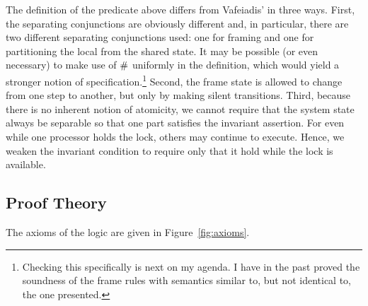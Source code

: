 \documentclass[11pt]{article}
\begin{document}
The definition of the predicate above differs from Vafeiadis' in three ways. First, the separating conjunctions are obviously different and, in particular, there are two different separating conjunctions used: one for framing and one for partitioning the local from the shared state. It may be possible (or even necessary) to make use of $\operatorname{\#}$ uniformly in the definition, which would yield a stronger notion of specification.\footnote{Checking this specifically is next on my agenda. I have in the past proved the soundness of the frame rules with semantics similar to, but not identical to, the one presented.} Second, the frame state is allowed to change from one step to another, but only by making silent transitions. Third, because there is no inherent notion of atomicity, we cannot require that the system state always be separable so that one part satisfies the invariant assertion. For even while one processor holds the lock, others may continue to execute. Hence, we weaken the invariant condition to require only that it hold while the lock is available.

\subsection{Proof Theory}

The axioms of the logic are given in Figure~\ref{fig:axioms}.
\end{document}
